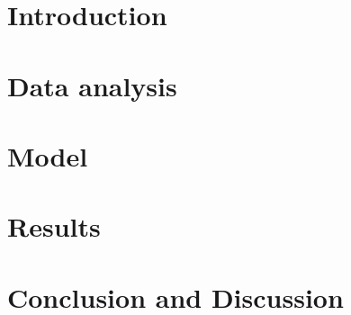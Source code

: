 \documentclass[11pt,titlepage,a4paper]{article}
\begin{document}
    

    \tableofcontents

    \newpage
    
    
    \newpage
    
    \section{Introduction}\label{section_introduction}
    
    \newpage
    
    \section{Data analysis}\label{section_data_analysis}
    
    \newpage
    
    \section{Model}\label{section_model}
    
    \newpage
    
    \section{Results}\label{section_results}
    
    \newpage
    
    \section{Conclusion and Discussion}\label{section_discussion}
    
    \newpage
    
    \printbibliography
    \newpage
    
    \appendix
    
\end{document}

